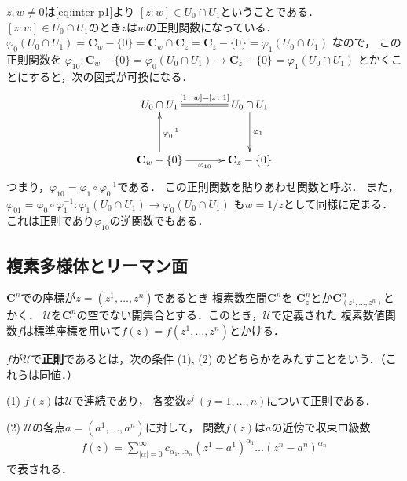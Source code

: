\documentclass[11pt, a4paper, dvipdfmx]{jsarticle}
\theoremstyle{definition}
\newcommand{\cc}{\mathbf{C}}
\newcommand{\mcal}{\mathcal}
\newcommand{\pphi}{\varphi} %
\newcommand{\UU}{\mcal{U}}
\theoremstyle{mystyle}
\numberwithin{equation}{section} %
\begin{document}
$z,w\ne 0$は\eqref{eq:inter-p1}より
$[z\colon w]\in U_0\cap U_1$ということである．
$[z\colon w]\in U_0\cap U_1$のとき$z$は$w$の正則関数になっている．
$\pphi_0 (U_0\cap U_1) = \cc_w-\{0\} 
= \cc_w \cap \cc_z 
= \cc_z-\{0\} 
= \pphi_1 (U_0\cap U_1)$
なので，
この正則関数を
$\pphi_{10}\colon \cc_w-\{0\}=\pphi_0 (U_0\cap U_1) 
\to \cc_z-\{0\} = \pphi_1 (U_0\cap U_1)$
とかくことにすると，次の図式が可換になる．
\begin{equation*}
    \vcenter{\xymatrix@C=35pt@R=35pt{
    {U_0\cap U_1} 
        \ar@{<-{}}[d]^{\pphi_0^{-1}} 
        \ar@{{}=}[r]^-{[1\colon w]=[z\colon 1]}
    & {U_0 \cap U_1} 
        \\
    \cc_w -\{0\}
        \ar[r]_{\pphi_{10}}
    & \cc_z -\{0\}
        \ar@{<-{}}[u]_{\pphi_1}
    }}
\end{equation*}
つまり，$\pphi_{10} = \pphi_1\circ \pphi_0^{-1}$である．
この正則関数を貼りあわせ関数と呼ぶ．
また，$\pphi_{01} = \pphi_0\circ \pphi_1^{-1}\colon \pphi_1 (U_0\cap U_1) \to \pphi_0 (U_0\cap U_1)$
も$w=1/z$として同様に定まる．これは正則であり$\pphi_{10}$の逆関数でもある．

\subsection{複素多様体とリーマン面}

$\cc^{n}$での座標が$z=(z^{1},\dots,z^{n})$であるとき
複素数空間$\cc^{n}$を
$\cc^{n}_{z}$とか$\cc^{n}_{(z^{1},\dots,z^{n})}$とかく．
$\UU$を$\cc^n$の空でない開集合とする．このとき，$\UU$で定義された
複素数値関数$f$は標準座標を用いて$f(z)=f(z^{1},\dots,z^{n})$とかける．

$f$が$\UU$で\textbf{正則}であるとは，次の条件 (1), (2) のどちらかをみたすことをいう．（これらは同値．）

(1) 
$f(z)$は$\UU$で連続であり，
各変数$z^{j}\ (j=1,\dots,n)$について正則である．

(2) 
$\UU$の各点$a=(a^1,\dots,a^n)$に対して，
関数$f(z)$は$a$の近傍で収束巾級数
\begin{align*}
    f(z)=\sum_{|\alpha|=0}^{\infty}c_{\alpha_1\dots\alpha_n}(z^1-a^1)^{\alpha_1}\dots(z^n-a^n)^{\alpha_n}
\end{align*}
で表される．
\end{document}
